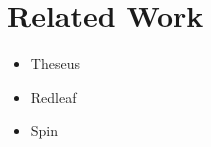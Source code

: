 \section{Related Work}
\begin{itemize}
    \item Theseus
    \item Redleaf
    \item Spin
\end{itemize}